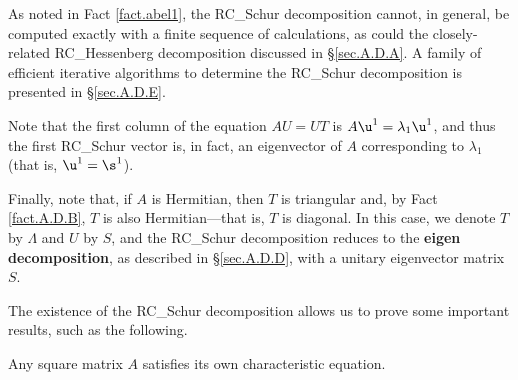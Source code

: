As noted in Fact \ref{fact.abel1}, the RC_Schur decomposition cannot, in general, be
computed exactly with a finite sequence of calculations, as could the
closely-related RC_Hessenberg decomposition discussed in \S \ref{sec.A.D.A}.
A family of efficient iterative algorithms to determine
the RC_Schur decomposition is presented in \S \ref{sec.A.D.E}.

Note that the first column of the equation $AU=UT$ is $A\u^1=\lambda_1\u^1$, and thus the
first RC_Schur vector is, in fact, an eigenvector of $A$ corresponding to $\lambda_1$ (that is, $\u^1=\s^1$).

Finally, note that, if $A$ is Hermitian, then $T$ is triangular and,
by Fact \ref{fact.A.D.B}, $T$ is also Hermitian---that is, $T$ is diagonal.  In
this case, we denote $T$ by $\Lambda$ and $U$ by $S$, and the RC_Schur
decomposition reduces to the {\bf eigen decomposition}, as described
in \S \ref{sec.A.D.D}, with a unitary eigenvector matrix $S$.


\noindent The existence of the RC_Schur decomposition allows us to prove some
important results, such as the following.

\begin{fact} \label{fact.A.D.C.Bc} Any square
matrix $A$ satisfies its own characteristic equation.
\end{fact}

